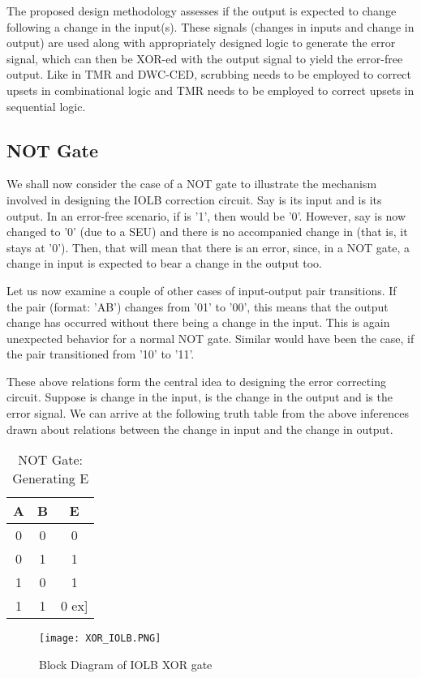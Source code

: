 \documentclass[10pt,journal,cspaper,compsoc]{IEEEtran}
\begin{document}
The proposed design methodology assesses if the output is expected to change following a change in the input(s). These signals (changes in inputs and change in output) are used along with appropriately designed logic to generate the error signal, which can then be XOR-ed with the output signal to yield the error-free output. Like in TMR and DWC-CED, scrubbing needs to be employed to correct upsets in combinational logic and TMR needs to be employed to correct upsets in sequential logic.
\subsection{NOT Gate}
We shall now consider the case of a NOT gate to illustrate the mechanism involved in designing the IOLB correction circuit. Say  is its input and  is its output. In an error-free scenario, if  is '1', then  would be '0'. However, say  is now changed to '0' (due to a SEU)  and there is no accompanied change in  (that is, it stays at '0'). Then, that will mean that there is an error, since, in a NOT gate, a change in input is expected to bear a change in the output too.

Let us now examine a couple of other cases of input-output pair transitions. If the pair (format: 'AB') changes from '01' to '00', this means that the output change has occurred without there being a change in the input. This is again unexpected behavior for a normal NOT gate. Similar would have been the case, if the pair transitioned from '10' to '11'.

These above relations form the central idea to designing the error correcting circuit. Suppose  is change in the input,  is the change in the output and  is the error signal. We can arrive at the following truth table from the above inferences drawn about relations between the change in input and the change in output.
\begin{table}[t]
\caption{NOT Gate: Generating E} \centering \begin{tabular}{|c| c| c|} \hline
A & B & E  \\ [1ex] \hline 0 & 0 & 0 \\ 0 & 1 & 1 \\
1 & 0 & 1 \\
1 & 1 & 0 \1ex] \hline \end{tabular}
\label{table:nonlin} \end{table}
\begin{figure}[t]
  \caption{Block Diagram of IOLB XOR gate }
  \centering
       \texttt{[image: XOR\_IOLB.PNG]}
\end{figure}
\end{document}
